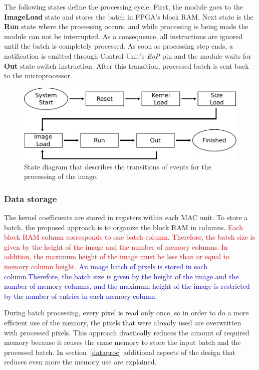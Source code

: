 \documentclass[conference,compsoc]{IEEEtran}
\begin{document}
The following states define the processing cycle. First, the module goes to the
\textbf{ImageLoad} state and stores the batch in FPGA's block RAM. Next state
is the \textbf{Run} state where the processing occurs, and while processing is
being made the module can not be interrupted. As a consequence, all instructions
are ignored until the batch is completely processed. As soon as processing step
ends, a notification is emitted through Control Unit's \textit{EoP} pin and
the module waits for \textbf{Out} state switch instruction. After this transition, processed batch is sent back to the microprocessor.


\begin{figure}[!t]
  \centering
  \includegraphics[scale=0.55]{states.pdf}
  \caption{State diagram that describes the transitions of events for the
    processing of the image.}
  \label{state}
\end{figure}

\subsubsection{Data storage}\label{infstorage}
The kernel coefficients are stored in registers within each MAC unit. To store a
batch, the proposed approach is to organize the block RAM in columns. \textcolor{red}{Each block RAM column corresponds to one batch
 column.} 
\textcolor{red}{Therefore, the batch size is given
by the height of the image and the number of memory columns. In addition, the maximum
height of the image must be less than or equal to memory column height.}
\textcolor{blue}{An image batch
of pixels is stored in each column.Therefore, the batch size is given
by the height of the image and the number of memory columns, and the maximum
height of the image is restricted by the number of entries in each memory
column.}

During batch processing, every pixel is read only once, so in order to do a
more efficient use of the memory, the pixels that were already used are
overwritten with processed pixels. This approach drastically reduces the amount
of required memory because it reuses the same memory to store the input batch and the
processed batch. In section~\ref{dataproc} additional aspects of the design
that reduces even more the memory use are explained.
\end{document}
